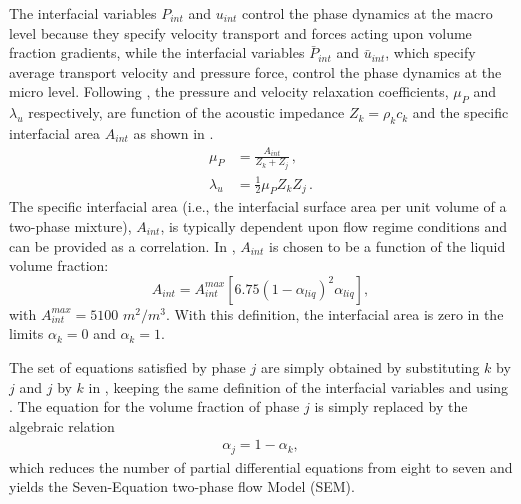 \documentclass[preprint,10pt]{elsarticle}
\begin{document}
%
The interfacial variables $P_{int}$ and $u_{int}$ control the phase dynamics at the macro level because they specify velocity transport
and forces acting upon volume fraction gradients, while the interfacial variables $\bar{P}_{int}$ and $\bar{u}_{int}$, which specify 
average transport velocity and pressure force, control the phase dynamics at the micro level.  Following \cite{SEM}, the pressure and 
velocity relaxation coefficients, $\mu_P$  and $\lambda_u$ respectively, are function of the acoustic 
impedance $Z_k = \rho_k c_k$ and the specific interfacial area $A_{int}$ as shown in .
%
\begin{subequations}
\label{eq:relaxation_coeff}
\begin{align}
  \label{E-R:86}
  \mu_P &= \frac{A_{int}}{Z_{k}+Z_{j}}       \,,
  \\
  \label{E-R:85}
  \lambda_u &= \frac{1}{2} \mu_P Z_{k} Z_{j} \,.
\end{align}
\end{subequations}
%
The specific interfacial area (i.e., the interfacial surface area per unit
volume of a two-phase mixture), $A_{int}$, is typically dependent upon flow regime conditions and can be provided as a correlation. 
In \cite{SEM}, $A_{int}$ is chosen to be a function of the liquid volume fraction:
%
\begin{equation}\label{eq:Aint-sect4}
A_{int} = A_{int}^{max} \left[ 6.75 \left(1-\alpha_{liq} \right)^2 \alpha_{liq} \right],
\end{equation}
% 
with $A_{int}^{max} = 5100$ $m^2 / m^3$. With this definition, the interfacial area is zero in the limits $\alpha_{k} = 0$ and $\alpha_{k} = 1$. 

The set of equations satisfied by phase $j$ are simply obtained by substituting $k$ by $j$ and $j$ by $k$ in , keeping 
the same definition of the interfacial variables and using . The equation for the volume fraction of phase $j$ is simply 
replaced by the algebraic relation
%
\begin{align}
 \alpha_{j}= 1 - \alpha_{k}, \nonumber
\end{align}
%
which reduces the number of partial differential equations from eight to seven and yields the Seven-Equation two-phase flow Model (SEM). 

\end{document}
